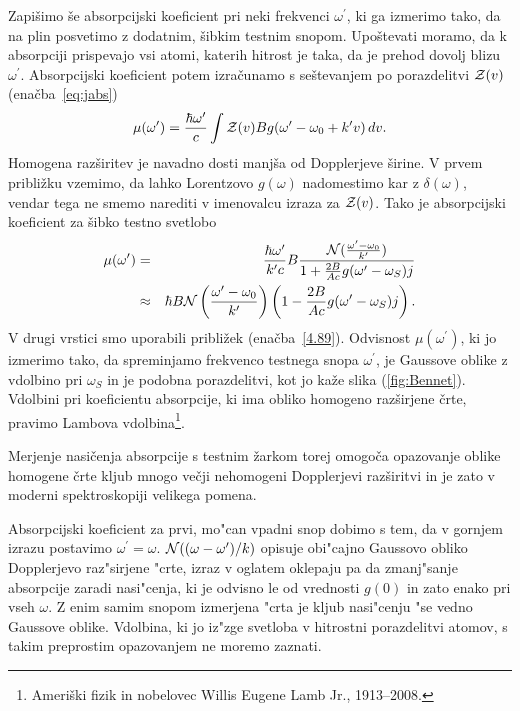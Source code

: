 Zapišimo še absorpcijski koeficient pri neki frekvenci $\omega^{\prime}$,
ki ga izmerimo tako, da na plin posvetimo z dodatnim, šibkim testnim
snopom. Upoštevati moramo, da k absorpciji prispevajo vsi atomi, katerih
hitrost je taka, da je prehod dovolj blizu $\omega^{\prime}$. Absorpcijski 
koeficient potem izračunamo s seštevanjem 
po porazdelitvi ${\cal Z}(v)$
(enačba~\ref{eq:jabs})
\begin{equation}
\mu(\omega^{\prime})=\frac{\hbar\omega^{\prime}}{c}\int{\cal Z}(v)Bg
(\omega^{\prime}-\omega_{0}+k'v)\, dv.
\label{4.90}
\end{equation}
Homogena razširitev je navadno dosti manjša od Dopplerjeve širine.
V prvem približku vzemimo, da lahko Lorentzovo $g(\omega)$ nadomestimo kar z
$\delta(\omega)$, vendar tega ne smemo narediti v imenovalcu
izraza za ${\cal Z}(v)$. Tako je absorpcijski koeficient za šibko testno svetlobo 
\begin{eqnarray}
\mu(\omega^{\prime}) & = & \frac{\hbar\omega^{\prime}}{k'c}B\frac{{\cal N}
(\frac{\omega^{\prime}-\omega_0}{k'})}{1+\frac{2B}{Ac}g(\omega'-\omega_S)j} \\ \nonumber 
 & \approx & \hbar B{\cal N}\left(\frac{\omega'-\omega_0}{k'}\right)\left(1-\frac{2B}{Ac}g(\omega'-\omega_S)j\right).
\end{eqnarray}
 V drugi vrstici smo uporabili približek (enačba~\ref{4.89}). Odvisnost $\mu(\omega^{\prime})$,
ki jo izmerimo tako, da spreminjamo frekvenco testnega snopa $\omega^{\prime}$,
je Gaussove oblike z vdolbino pri $\omega_S$ in je podobna porazdelitvi, 
kot jo kaže slika (\ref{fig:Bennet}). Vdolbini pri koeficientu
absorpcije, ki ima obliko homogeno razširjene črte, pravimo
Lambova vdolbina\footnote{Ameriški fizik in nobelovec 
Willis Eugene Lamb Jr., 1913--2008.}. 

Merjenje nasičenja absorpcije s testnim
žarkom torej omogoča opazovanje oblike homogene črte kljub mnogo večji
nehomogeni Dopplerjevi razširitvi in je zato v moderni spektroskopiji
velikega pomena.

Absorpcijski koeficient za prvi, mo"can vpadni snop dobimo s tem, da v
gornjem izrazu postavimo $\omega^{\prime}=\omega$. ${\cal N}((\omega-
\omega^{\prime})/k)$ opisuje obi"cajno Gaussovo obliko Dopplerjevo
raz"sirjene "crte, izraz v oglatem oklepaju pa da zmanj"sanje absorpcije
zaradi nasi"cenja, ki je odvisno le od vrednosti $g(0)$ in zato enako pri
vseh $\omega$. Z enim samim snopom izmerjena "crta je kljub nasi"cenju "se
vedno Gaussove oblike. Vdolbina, ki jo iz"zge svetloba v hitrostni
porazdelitvi atomov, s takim preprostim opazovanjem ne moremo zaznati.

